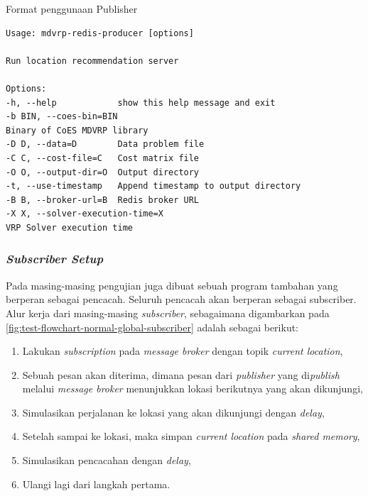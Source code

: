 \begin{listing}[!]
	\caption{Format penggunaan Publisher}
	\label{lst:publisher-usage}
	\begin{verbatim}
Usage: mdvrp-redis-producer [options]

Run location recommendation server

Options:
-h, --help            show this help message and exit
-b BIN, --coes-bin=BIN
Binary of CoES MDVRP library
-D D, --data=D        Data problem file
-C C, --cost-file=C   Cost matrix file
-O O, --output-dir=O  Output directory
-t, --use-timestamp   Append timestamp to output directory
-B B, --broker-url=B  Redis broker URL
-X X, --solver-execution-time=X
VRP Solver execution time
	\end{verbatim}
\end{listing}


\subsubsection{\textit{Subscriber Setup}}
Pada masing-masing pengujian juga dibuat sebuah program tambahan yang berperan sebagai pencacah. Seluruh pencacah akan berperan sebagai subscriber. Alur kerja dari masing-masing \textit{subscriber}, sebagaimana digambarkan pada \autoref{fig:test-flowchart-normal-global-subscriber} adalah sebagai berikut:


\begin{enumerate}
	\item Lakukan \textit{subscription} pada \textit{message broker} dengan topik \textit{current location}, 
	\item Sebuah pesan akan diterima, dimana pesan dari \textit{publisher} yang di\textit{publish} melalui \textit{message broker} menunjukkan lokasi berikutnya yang akan dikunjungi,
	\item Simulasikan perjalanan ke lokasi yang akan dikunjungi dengan \textit{delay},
	\item Setelah sampai ke lokasi, maka simpan \textit{current location} pada \textit{shared memory}, 
	\item Simulasikan pencacahan dengan \textit{delay}, 
	\item Ulangi lagi dari langkah pertama.
\end{enumerate}


